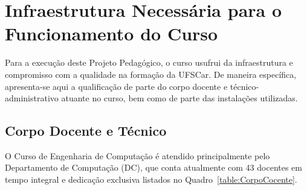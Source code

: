 
\section {Infraestrutura Necessária para o Funcionamento do Curso}

Para a execução deste Projeto Pedagógico, o curso usufrui da infraestrutura e compromisso com a qualidade na formação da UFSCar. De maneira específica, apresenta-se aqui a qualificação de parte do corpo docente e técnico-administrativo atuante no curso, bem como de parte das instalações utilizadas.

\subsection{Corpo Docente e Técnico}

O Curso de Engenharia de Computação é atendido principalmente pelo Departamento de Computação (DC), que conta atualmente com 43 docentes em tempo integral e dedicação exclusiva listados no Quadro~\ref{table:CorpoCocente}.


